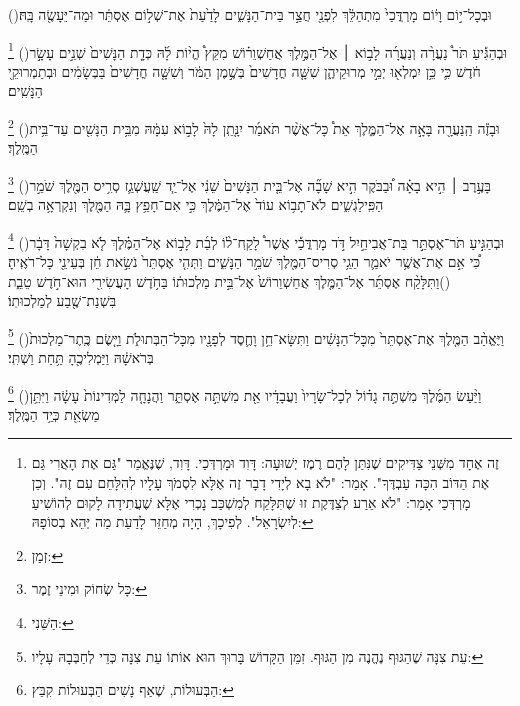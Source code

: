 \documentclass[12pt, openany]{book}
\newcommand{\footnotecomment}[1]{
	\renewcommand\thefootnote{}
	\footnote{\textsf{#1}}}
\newcommand{\commenta}[1]{\footnotecomment{#1}\hspace{0em}}
\newcommand{\vsnum}[1]{(\hebrewnumeral{#1})\space}
\begin{document}
{\vsnum{11}וּבְכָל־י֣וֹם וָי֔וֹם מָרְדֳּכַי֙ מִתְהַלֵּ֔ךְ לִפְנֵ֖י חֲצַ֣ר בֵּית־הַנָּשִׁ֑ים לָדַ֙עַת֙ אֶת־שְׁל֣וֹם אֶסְתֵּ֔ר וּמַה־יֵּעָשֶׂ֖ה בָּֽהּ׃%
\commenta{ זֶה אֶחָד מִשְּׁנֵי צַדִּיקִים שֶׁנִּתַּן לָהֶם רֶמֶז יְשׁוּעָה: דָּוִד וּמָרְדְּכַי. דָּוִד, שֶׁנֶּאֱמַר "גַּם אֶת הָאֲרִי גַּם אֶת הַדּוֹב הִכָּה עַבְדֶּךָ". אָמַר: "לֹא בָא לְיָדִי דָבָר זֶה אֶלָּא לִסְמֹךְ עָלָיו לְהִלָּחֵם עִם זֶה". וְכֵן מָרְדְּכַי אָמַר: "לֹא אֵרַע לְצַדֶּקֶת זוּ שֶׁתִּלָּקַח לְמִשְׁכַּב נָכְרִי אֶלָּא שֶׁעֲתִידָה לָקוּם לְהוֹשִׁיעַ לְיִשְׂרָאֵל". לְפִיכָךְ, הָיָה מְחַזֵּר לָדַעַת מַה יְּהֵא בְסוֹפָהּ: }%
\vsnum{12}וּבְהַגִּ֡יעַ תֹּר֩ נַעֲרָ֨ה וְנַעֲרָ֜ה לָב֣וֹא ׀ אֶל־הַמֶּ֣לֶךְ אֲחַשְׁוֵר֗וֹשׁ מִקֵּץ֩ הֱי֨וֹת לָ֜הּ כְּדָ֤ת הַנָּשִׁים֙ שְׁנֵ֣ים עָשָׂ֣ר חֹ֔דֶשׁ כִּ֛י כֵּ֥ן יִמְלְא֖וּ יְמֵ֣י מְרוּקֵיהֶ֑ן שִׁשָּׁ֤ה חֳדָשִׁים֙ בְּשֶׁ֣מֶן הַמֹּ֔ר וְשִׁשָּׁ֤ה חֳדָשִׁים֙ בַּבְּשָׂמִ֔ים וּבְתַמְרוּקֵ֖י הַנָּשִֽׁים׃%
\commenta{ זְמַן:}%
\vsnum{13}וּבָזֶ֕ה הַֽנַּעֲרָ֖ה בָּאָ֣ה אֶל־הַמֶּ֑לֶךְ אֵת֩ כָּל־אֲשֶׁ֨ר תֹּאמַ֜ר יִנָּ֤תֵֽן לָהּ֙ לָב֣וֹא עִמָּ֔הּ מִבֵּ֥ית הַנָּשִׁ֖ים עַד־בֵּ֥ית הַמֶּֽלֶךְ׃%
\commenta{ כָּל שְׂחוֹק וּמִינֵי זֶמֶר:}%
\vsnum{14}בָּעֶ֣רֶב ׀ הִ֣יא בָאָ֗ה וּ֠בַבֹּקֶר הִ֣יא שָׁבָ֞ה אֶל־בֵּ֤ית הַנָּשִׁים֙ שֵׁנִ֔י אֶל־יַ֧ד שַֽׁעֲשְׁגַ֛ז סְרִ֥יס הַמֶּ֖לֶךְ שֹׁמֵ֣ר הַפִּֽילַגְשִׁ֑ים לֹא־תָב֥וֹא עוֹד֙ אֶל־הַמֶּ֔לֶךְ כִּ֣י אִם־חָפֵ֥ץ בָּ֛הּ הַמֶּ֖לֶךְ וְנִקְרְאָ֥ה בְשֵֽׁם׃%
\commenta{ הַשֵּׁנִי:}%
\vsnum{15}וּבְהַגִּ֣יעַ תֹּר־אֶסְתֵּ֣ר בַּת־אֲבִיחַ֣יִל דֹּ֣ד מָרְדֳּכַ֡י אֲשֶׁר֩ לָקַֽח־ל֨וֹ לְבַ֜ת לָב֣וֹא אֶל־הַמֶּ֗לֶךְ לֹ֤א בִקְשָׁה֙ דָּבָ֔ר כִּ֠י אִ֣ם אֶת־אֲשֶׁ֥ר יֹאמַ֛ר הֵגַ֥י סְרִיס־הַמֶּ֖לֶךְ שֹׁמֵ֣ר הַנָּשִׁ֑ים וַתְּהִ֤י אֶסְתֵּר֙ נֹשֵׂ֣את חֵ֔ן בְּעֵינֵ֖י כָּל־רֹאֶֽיהָ׃
\vsnum{16}וַתִּלָּקַ֨ח אֶסְתֵּ֜ר אֶל־הַמֶּ֤לֶךְ אֲחַשְׁוֵרוֹשׁ֙ אֶל־בֵּ֣ית מַלְכוּת֔וֹ בַּחֹ֥דֶשׁ הָעֲשִׂירִ֖י הוּא־חֹ֣דֶשׁ טֵבֵ֑ת בִּשְׁנַת־שֶׁ֖בַע לְמַלְכוּתֽוֹ׃%
\commenta{ עֵת צִנָּה שֶׁהַגּוּף נֶהֱנֶה מִן הַגּוּף. זִמֵּן הַקָּדוֹשׁ בָּרוּךְ הוּא אוֹתוֹ עֵת צִנָּה כְּדֵי לְחַבְּבָהּ עָלָיו:}%
\vsnum{17}וַיֶּאֱהַ֨ב הַמֶּ֤לֶךְ אֶת־אֶסְתֵּר֙ מִכָּל־הַנָּשִׁ֔ים וַתִּשָּׂא־חֵ֥ן וָחֶ֛סֶד לְפָנָ֖יו מִכָּל־הַבְּתוּלֹ֑ת וַיָּ֤שֶׂם כֶּֽתֶר־מַלְכוּת֙ בְּרֹאשָׁ֔הּ וַיַּמְלִיכֶ֖הָ תַּ֥חַת וַשְׁתִּֽי׃%
\commenta{ הַבְּעוּלוֹת, שֶׁאַף נָשִׁים הַבְּעוּלוֹת קִבֵּץ: }%
\vsnum{18}וַיַּ֨עַשׂ הַמֶּ֜לֶךְ מִשְׁתֶּ֣ה גָד֗וֹל לְכָל־שָׂרָיו֙ וַעֲבָדָ֔יו אֵ֖ת מִשְׁתֵּ֣ה אֶסְתֵּ֑ר וַהֲנָחָ֤ה לַמְּדִינוֹת֙ עָשָׂ֔ה וַיִּתֵּ֥ן מַשְׂאֵ֖ת כְּיַ֥ד הַמֶּֽלֶךְ׃%
}
\end{document}
